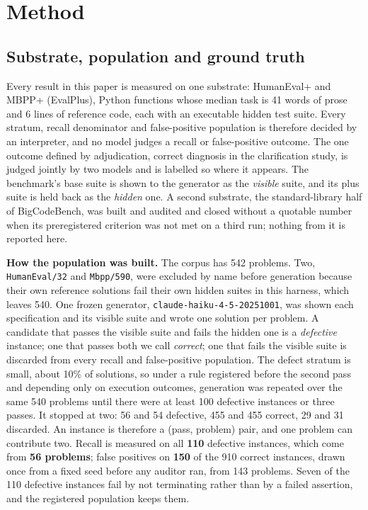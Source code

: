 \section{Method}
\label{sec:method}

\subsection{Substrate, population and ground truth}

Every result in this paper is measured on one substrate: HumanEval+ and MBPP+ (EvalPlus),
Python functions whose median task is 41 words of prose and 6 lines of reference code, each with
an executable hidden test suite. Every stratum, recall denominator and false-positive population
is therefore decided by an interpreter, and no model judges a recall or false-positive outcome.
The one outcome defined by adjudication, correct diagnosis in the clarification study, is judged
jointly by two models and is labelled so where it appears. The benchmark's base suite is shown to
the generator as the \emph{visible} suite, and its plus suite is held back as the \emph{hidden}
one. A second substrate, the standard-library half of BigCodeBench, was built and audited and
closed without a quotable number when its preregistered criterion was not met on a third run;
nothing from it is reported here.

\textbf{How the population was built.} The corpus has 542 problems. Two, \texttt{HumanEval/32}
and \texttt{Mbpp/590}, were excluded by name before generation because their own reference
solutions fail their own hidden suites in this harness, which leaves 540. One frozen generator,
\texttt{claude-haiku-4-5-20251001}, was shown each specification and its visible suite and wrote
one solution per problem. A candidate that passes the visible suite and fails the hidden one is a
\emph{defective} instance; one that passes both we call \emph{correct}; one that fails the visible
suite is discarded from every recall and false-positive population. The defect stratum is small,
about 10\% of solutions, so under a rule registered before the second pass and depending only on
execution outcomes, generation was repeated over the same 540 problems until there were at least
100 defective instances or three passes. It stopped at two: 56 and 54 defective, 455 and 455
correct, 29 and 31 discarded. An instance is therefore a (pass, problem) pair, and one problem can
contribute two. Recall is measured on all \textbf{110} defective instances, which come from
\textbf{56 problems}; false positives on \textbf{150} of the 910 correct instances, drawn once
from a fixed seed before any auditor ran, from 143 problems. Seven of the 110 defective instances
fail by not terminating rather than by a failed assertion, and the registered population keeps
them.

